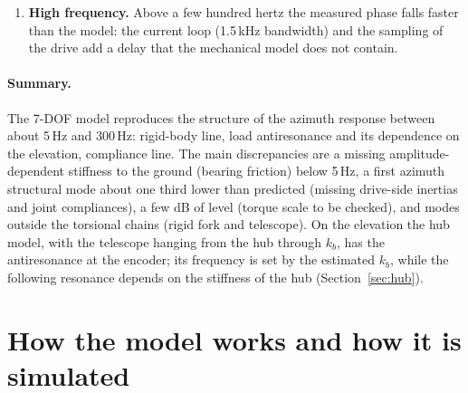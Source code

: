 \documentclass[10pt,a4paper]{article}
\numberwithin{equation}{section}
\begin{document}
\begin{enumerate}
\item \textbf{High frequency.} Above a few hundred hertz the measured phase falls faster than the model: the current loop (1.5\,kHz bandwidth) and the sampling of the drive add a delay that the mechanical model does not contain.
\end{enumerate}

\paragraph{Summary.} The 7-DOF model reproduces the structure of the azimuth response between about 5\,Hz and 300\,Hz: rigid-body line, load antiresonance and its dependence on the elevation, compliance line. The main discrepancies are a missing amplitude-dependent stiffness to the ground (bearing friction) below 5\,Hz, a first azimuth structural mode about one third lower than predicted (missing drive-side inertias and joint compliances), a few dB of level (torque scale to be checked), and modes outside the torsional chains (rigid fork and telescope). On the elevation the hub model, with the telescope hanging from the hub through $k_b$, has the antiresonance at the encoder; its frequency is set by the estimated $k_b$, while the following resonance depends on the stiffness of the hub (Section~\ref{sec:hub}).
\section{How the model works and how it is simulated}\label{sec:workflow}
\end{document}
